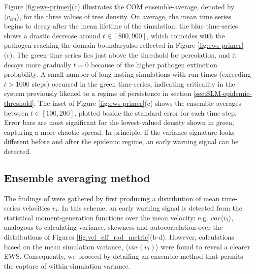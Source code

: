 Figure \ref{fig:ews-primer}(c) illustrates the COM ensemble-average, denoted by $\langle v_{cm}\rangle$, for the three values of tree density.
On average, the mean time series begins to decay after the mean lifetime of the simulation; the blue time-series shows a drastic decrease around $t \in [800, 900]$, which coincides with the pathogen reaching the domain boundary\textemdash also reflected in Figure \ref{fig:ews-primer}(c).
The green time series lies just above the threshold for percolation, and it decays more gradually $t=0$ because of the higher pathogen extinction probability. 
A small number of long-lasting simulations with run times (exceeding $t>1000$ steps) occurred in the green time-series, indicating criticality in the system\textemdash 
previously likened to a regime of persistence in section \ref{sec:SLM-epidemic-threshold}.
The inset of Figure \ref{fig:ews-primer}(c) shows the ensemble-averages between $t\in [100, 200]$, plotted beside the standard error for each time-step.
Error bars are most significant for the lowest-valued density shown in green, capturing a more chaotic spread.
In principle, if the variance signature looks different before and after the epidemic regime, an early warning signal can be detected. 

\subsection{Ensemble averaging method}

The findings of \cite{OROZCOFUENTES201912} were gathered by first producing a distribution of mean time-series velocities $\overline{v}_t$.
In this scheme, an early warning signal is detected from the statistical moment-generation functions over the mean velocity: e.g. $var\big\langle \overline{v}_t \big\rangle$,
analogous to calculating variance, skewness and autocorrelation over the distributions of Figures \ref{fig:vel_eff_rad_metric}(b-d).
However, calculations based on the mean simulation variance, $ \big\langle \overline{var}({v}_t) \big\rangle $ were found to reveal a clearer EWS.
Consequently, we proceed by detailing an ensemble method that permits the capture of within-simulation variance. 

